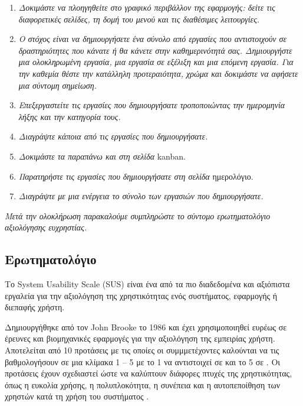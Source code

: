             \begin{enumerate}[label=\textit{\arabic*}.]
                \setlength\itemsep{-0.25em}
                \item \textit{Δοκιμάστε να πλοηγηθείτε στο γραφικό περιβάλλον της εφαρμογής: δείτε τις διαφορετικές σελίδες, τη δομή του μενού και τις διαθέσιμες λειτουργίες.}
                \item \textit{Ο στόχος είναι να δημιουργήσετε ένα σύνολο από εργασίες που αντιστοιχούν σε δραστηριότητες που κάνατε ή θα κάνετε στην καθημερινότητά σας. Δημιουργήστε μια ολοκληρωμένη εργασία, μια εργασία σε εξέλιξη και μια επόμενη εργασία. Για την καθεμία θέστε την κατάλληλη προτεραιότητα, χρώμα και δοκιμάστε να αφήσετε μια σύντομη σημείωση.}
                \item \textit{Επεξεργαστείτε τις εργασίες που δημιουργήσατε τροποποιώντας την ημερομηνία λήξης και την κατηγορία τους.}
                \item \textit{Διαγράψτε κάποια από τις εργασίες που δημιουργήσατε.}
                \item \textit{Δοκιμάστε τα παραπάνω και στη σελίδα} {\ZonaSB kanban}.
                \item \textit{Παρατηρήστε τις εργασίες που δημιουργήσατε στη σελίδα} {\ZonaSB ημερολόγιο}.
                \item \textit{Διαγράψτε με μια ενέργεια το σύνολο των εργασιών που δημιουργήσατε.}
            \end{enumerate}

            \textit{Μετά την ολοκλήρωση παρακαλούμε συμπληρώστε το σύντομο ερωτηματολόγιο αξιολόγησης ευχρηστίας.}

        \subsection{Ερωτηματολόγιο}
            Το System Usability Scale (SUS) είναι ένα από τα πιο διαδεδομένα και αξιόπιστα εργαλεία για την αξιολόγηση της χρηστικότητας ενός συστήματος, εφαρμογής ή διεπαφής χρήστη.

            Δημιουργήθηκε από τον John Brooke το 1986 και έχει χρησιμοποιηθεί ευρέως σε έρευνες και βιομηχανικές εφαρμογές για την αξιολόγηση της εμπειρίας χρήστη. Αποτελείται από 10 προτάσεις με τις οποίες οι συμμμετέχοντες καλούνται να τις βαθμολογήσουν σε μια κλίμακα 1 -- 5 με το 1 να αντιστοιχεί σε  και το 5 σε . Οι προτάσεις έχουν σχεδιαστεί ώστε να καλύπτουν διάφορες πτυχές της χρηστικότητας, όπως η ευκολία χρήσης, η πολυπλοκότητα, η συνέπεια και η αυτοπεποίθηση των χρηστών κατά τη χρήση του συστήματος \cite{SUS, SUSXenos}.

